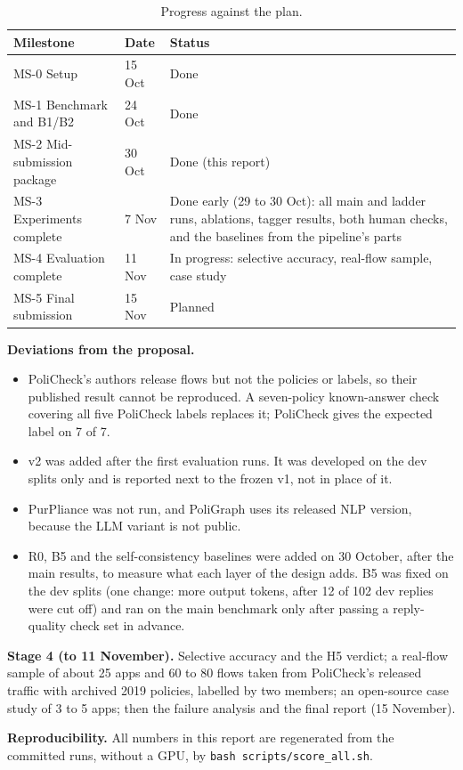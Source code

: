\documentclass[11pt,a4paper]{article}
\begin{document}
\begin{table}[H]
\centering
\small
\begin{tabular}{llp{8.6cm}}
\toprule
Milestone & Date & Status \\
\midrule
MS-0 Setup & 15 Oct & Done \\
MS-1 Benchmark and B1/B2 & 24 Oct & Done \\
MS-2 Mid-submission package & 30 Oct & Done (this report) \\
MS-3 Experiments complete & 7 Nov & Done early (29 to 30 Oct): all main and ladder runs, ablations,
tagger results, both human checks, and the baselines from the pipeline's parts \\
MS-4 Evaluation complete & 11 Nov & In progress: selective accuracy, real-flow sample, case study \\
MS-5 Final submission & 15 Nov & Planned \\
\bottomrule
\end{tabular}
\caption{Progress against the plan.}
\end{table}

\textbf{Deviations from the proposal.}
\begin{itemize}
  \item PoliCheck's authors release flows but not the policies or labels, so their published result
        cannot be reproduced. A seven-policy known-answer check covering all five PoliCheck labels
        replaces it; PoliCheck gives the expected label on 7 of 7.
  \item v2 was added after the first evaluation runs. It was developed on the dev splits only and
        is reported next to the frozen v1, not in place of it.
  \item PurPliance was not run, and PoliGraph uses its released NLP version, because the LLM
        variant is not public.
  \item R0, B5 and the self-consistency baselines were added on 30 October, after the main
        results, to measure what each layer of the design adds. B5 was fixed on the dev splits (one
        change: more output tokens, after 12 of 102 dev replies were cut off) and ran on the main
        benchmark only after passing a reply-quality check set in advance.
\end{itemize}

\textbf{Stage 4 (to 11 November).} Selective accuracy and the H5 verdict; a real-flow sample of
about 25 apps and 60 to 80 flows taken from PoliCheck's released traffic with archived 2019
policies, labelled by two members; an open-source case study of 3 to 5 apps; then the failure
analysis and the final report (15 November).

\textbf{Reproducibility.} All numbers in this report are regenerated from the committed runs,
without a GPU, by \texttt{bash scripts/score\_all.sh}.
\end{document}
